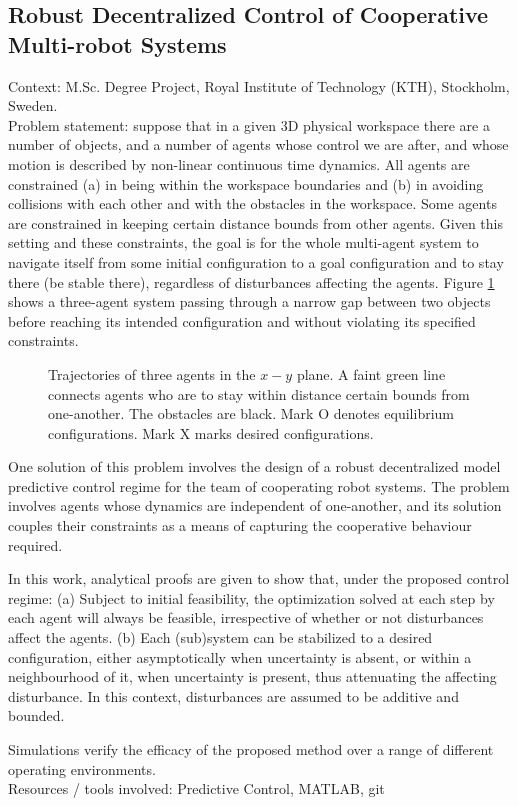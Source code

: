 \subsection{Robust Decentralized Control of Cooperative Multi-robot Systems}

Context: M.Sc. Degree Project, Royal Institute of Technology (KTH), Stockholm, Sweden.\\

Problem statement: suppose that in a given 3D physical workspace there are
a number of objects, and a number of agents whose control we are after, and
whose motion is described by non-linear continuous time dynamics. All agents
are constrained (a) in being within the workspace boundaries and (b) in avoiding
collisions with each other and with the obstacles in the workspace. Some agents
are constrained in keeping certain distance bounds from other agents. Given this
setting and these constraints, the goal is for the whole multi-agent system to
navigate itself from some initial configuration to a goal configuration and to
stay there (be stable there), regardless of disturbances affecting the agents.
Figure \ref{fig:d_OFF_res_trajectory_3_2} shows a three-agent system passing
through a narrow gap between two objects before reaching its intended
configuration and without violating its specified constraints.

\begin{figure}[H]
  \scalebox{0.8}{}
  \caption{Trajectories of three agents in the $x-y$ plane. A faint green line
    connects agents who are to stay within distance certain bounds from
    one-another. The obstacles are black. Mark O denotes equilibrium
    configurations. Mark X marks desired configurations.}
  \label{fig:d_OFF_res_trajectory_3_2}
\end{figure}

One solution of this problem involves the design of a robust decentralized model
predictive control regime for the team of cooperating robot systems. The problem
involves agents whose dynamics are independent of one-another, and its solution
couples their constraints as a means of capturing the cooperative behaviour required.

In this work, analytical proofs are given to show that, under the proposed
control regime: (a) Subject to initial feasibility, the optimization solved at
each step by each agent will always be feasible, irrespective of whether or not
disturbances affect the agents. (b) Each (sub)system can be stabilized to a
desired configuration, either asymptotically when uncertainty is absent,
or within a neighbourhood of it, when uncertainty is present, thus attenuating
the affecting disturbance. In this context, disturbances are assumed to be
additive and bounded.

Simulations verify the efficacy of the proposed method over a range of
different operating environments.\\

Resources / tools involved: Predictive Control, MATLAB, git
